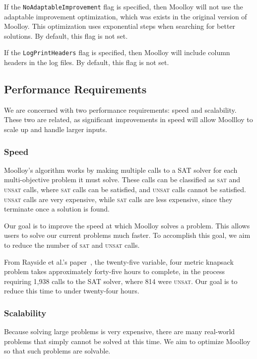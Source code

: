 \documentclass[11pt]{article}
\theoremstyle{definition}
\begin{document}
If the \texttt{NoAdaptableImprovement} flag is specified, then Moolloy
will not use the adaptable improvement optimization, which was exists
in the original version of Moolloy. This optimization uses exponential
steps when searching for better solutions. By default, this flag is not
set.

If the \texttt{LogPrintHeaders} flag is specified, then Moolloy will
include column headers in the log files. By default, this flag is not
set.

\subsection{Performance Requirements}\label{sec:perf_req}

We are concerned with two performance requirements: speed and
scalability. These two are related, as significant improvements in
speed will allow Moollloy to scale up and handle larger inputs.

\subsubsection{Speed}\label{sec:perf_speed}

Moolloy's algorithm works by making multiple calls to a SAT solver for
each multi-objective problem it must solve. These calls can be
classified as \textsc{sat} and \textsc{unsat} calls, where \textsc{sat}
calls can be satisfied, and \textsc{unsat} calls cannot be satisfied.
\textsc{unsat} calls are very expensive, while \textsc{sat} calls are
less expensive, since they terminate once a solution is found.

Our goal is to improve the speed at which Moolloy solves a problem.
This allows users to solve our current problems much faster. To
accomplish this goal, we aim to reduce the number of \textsc{sat} and
\textsc{unsat} calls.

From Rayside et al.'s paper~\cite{ref:Rayside09}, the twenty-five
variable, four metric knapsack problem takes approximately forty-five
hours to complete, in the process requiring 1,938 calls to the SAT
solver, where 814 were \textsc{unsat}. Our goal is to reduce this time
to under twenty-four hours.

\subsubsection{Scalability}\label{sec:perf_scale}

Because solving large problems is very expensive, there are many
real-world problems that simply cannot be solved at this time. We aim
to optimize Moolloy so that such problems are solvable.
\end{document}
